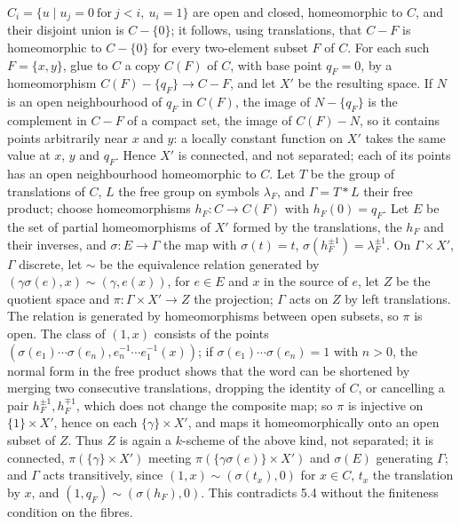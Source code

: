 \(C_i=\{u\mid u_j=0\ \text{for}\ j<i,\ u_i=1\}\) are open and closed, homeomorphic to \(C\), and their disjoint
union is \(C-\{0\}\); it follows, using translations, that \(C-F\) is homeomorphic to \(C-\{0\}\) for every
two-element subset \(F\) of \(C\). For each such \(F=\{x,y\}\), glue to \(C\) a copy \(C(F)\) of \(C\), with base
point \(q_F=0\), by a homeomorphism \(C(F)-\{q_F\}\to C-F\), and let \(X'\) be the resulting space. If \(N\) is
an open neighbourhood of \(q_F\) in \(C(F)\), the image of \(N-\{q_F\}\) is the complement in \(C-F\) of a compact
set, the image of \(C(F)-N\), so it contains points arbitrarily near \(x\) and \(y\): a locally constant function
on \(X'\) takes the same value at \(x\), \(y\) and \(q_F\). Hence \(X'\) is connected, and not separated; each of
its points has an open neighbourhood homeomorphic to \(C\). Let \(T\) be the group of translations of \(C\), \(L\)
the free group on symbols \(\lambda_F\), and \(\Gamma=T*L\) their free product; choose homeomorphisms
\(h_F\colon C\to C(F)\) with \(h_F(0)=q_F\). Let \(E\) be the set of partial homeomorphisms of \(X'\) formed by
the translations, the \(h_F\) and their inverses, and \(\sigma\colon E\to\Gamma\) the map with \(\sigma(t)=t\),
\(\sigma(h_F^{\pm1})=\lambda_F^{\pm1}\). On \(\Gamma\times X'\), \(\Gamma\) discrete, let \(\sim\) be the
equivalence relation generated by \((\gamma\sigma(e),x)\sim(\gamma,e(x))\), for \(e\in E\) and \(x\) in the source
of \(e\), let \(Z\) be the quotient space and \(\pi\colon\Gamma\times X'\to Z\) the projection; \(\Gamma\) acts on
\(Z\) by left translations. The relation is generated by homeomorphisms between open subsets, so \(\pi\) is open.
The class of \((1,x)\) consists of the points \((\sigma(e_1)\cdots\sigma(e_n),e_n^{-1}\cdots e_1^{-1}(x))\); if
\(\sigma(e_1)\cdots\sigma(e_n)=1\) with \(n>0\), the normal form in the free product shows that the word can be
shortened by merging two consecutive translations, dropping the identity of \(C\), or cancelling a pair
\(h_F^{\pm1},h_F^{\mp1}\), which does not change the composite map; so \(\pi\) is injective on \(\{1\}\times X'\),
hence on each \(\{\gamma\}\times X'\), and maps it homeomorphically onto an open subset of \(Z\). Thus \(Z\) is
again a \(k\)-scheme of the above kind, not separated; it is connected, \(\pi(\{\gamma\}\times X')\) meeting
\(\pi(\{\gamma\sigma(e)\}\times X')\) and \(\sigma(E)\) generating \(\Gamma\); and \(\Gamma\) acts transitively,
since \((1,x)\sim(\sigma(t_x),0)\) for \(x\in C\), \(t_x\) the translation by \(x\), and
\((1,q_F)\sim(\sigma(h_F),0)\). This contradicts 5.4 without the finiteness condition on the fibres.
\par\medskip
